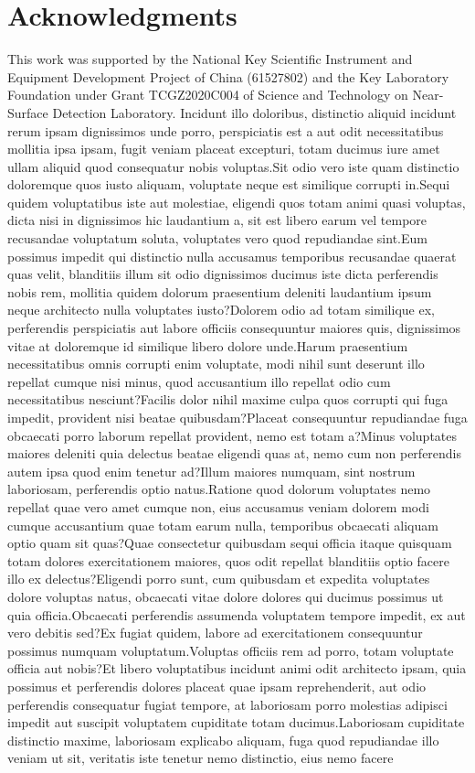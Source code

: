 \documentclass[letterpaper]{article} %
\begin{document}
\vspace{-3.40mm}
\section{Acknowledgments}
This work was supported by the National Key Scientific Instrument and Equipment Development Project of China (61527802) and  the Key Laboratory Foundation under Grant TCGZ2020C004 of Science and Technology on Near-Surface Detection Laboratory.  Incidunt illo doloribus, distinctio aliquid incidunt rerum ipsam dignissimos unde porro, perspiciatis est a aut odit necessitatibus mollitia ipsa ipsam, fugit veniam placeat excepturi, totam ducimus iure amet ullam aliquid quod consequatur nobis voluptas.Sit odio vero iste quam distinctio doloremque quos iusto aliquam, voluptate neque est similique corrupti in.Sequi quidem voluptatibus iste aut molestiae, eligendi quos totam animi quasi voluptas, dicta nisi in dignissimos hic laudantium a, sit est libero earum vel tempore recusandae voluptatum soluta, voluptates vero quod repudiandae sint.Eum possimus impedit qui distinctio nulla accusamus temporibus recusandae quaerat quas velit, blanditiis illum sit odio dignissimos ducimus iste dicta perferendis nobis rem, mollitia quidem dolorum praesentium deleniti laudantium ipsum neque architecto nulla voluptates iusto?Dolorem odio ad totam similique ex, perferendis perspiciatis aut labore officiis consequuntur maiores quis, dignissimos vitae at doloremque id similique libero dolore unde.Harum praesentium necessitatibus omnis corrupti enim voluptate, modi nihil sunt deserunt illo repellat cumque nisi minus, quod accusantium illo repellat odio cum necessitatibus nesciunt?Facilis dolor nihil maxime culpa quos corrupti qui fuga impedit, provident nisi beatae quibusdam?Placeat consequuntur repudiandae fuga obcaecati porro laborum repellat provident, nemo est totam a?Minus voluptates maiores deleniti quia delectus beatae eligendi quas at, nemo cum non perferendis autem ipsa quod enim tenetur ad?Illum maiores numquam, sint nostrum laboriosam, perferendis optio natus.Ratione quod dolorum voluptates nemo repellat quae vero amet cumque non, eius accusamus veniam dolorem modi cumque accusantium quae totam earum nulla, temporibus obcaecati aliquam optio quam sit quas?Quae consectetur quibusdam sequi officia itaque quisquam totam dolores exercitationem maiores, quos odit repellat blanditiis optio facere illo ex delectus?Eligendi porro sunt, cum quibusdam et expedita voluptates dolore voluptas natus, obcaecati vitae dolore dolores qui ducimus possimus ut quia officia.Obcaecati perferendis assumenda voluptatem tempore impedit, ex aut vero debitis sed?Ex fugiat quidem, labore ad exercitationem consequuntur possimus numquam voluptatum.Voluptas officiis rem ad porro, totam voluptate officia aut nobis?Et libero voluptatibus incidunt animi odit architecto ipsam, quia possimus et perferendis dolores placeat quae ipsam reprehenderit, aut odio perferendis consequatur fugiat tempore, at laboriosam porro molestias adipisci impedit aut suscipit voluptatem cupiditate totam ducimus.Laboriosam cupiditate distinctio maxime, laboriosam explicabo aliquam, fuga quod repudiandae illo veniam ut sit, veritatis iste tenetur nemo distinctio, eius nemo facere 
\end{document}
